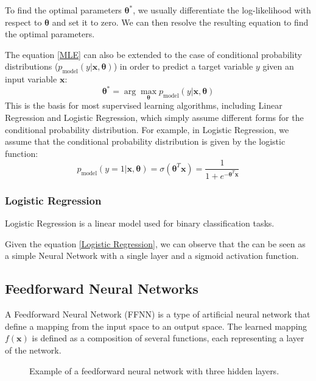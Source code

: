 To find the optimal parameters $\boldsymbol{\theta}^*$, we usually differentiate the log-likelihood with respect to $\boldsymbol{\theta}$ and set it
to zero. We can then resolve the resulting equation to find the optimal parameters.

The equation \ref{MLE} can also be extended to the case of conditional probability distributions ($p_{\text{model}}(y|\boldsymbol{x}, \boldsymbol{\theta})$) in order to predict a target variable $y$ given an input variable $\boldsymbol{x}$:
\begin{equation*}
    \boldsymbol{\theta}^* = \arg\max_{\boldsymbol{\theta}} p_{\text{model}}(y|\boldsymbol{x}, \boldsymbol{\theta})
\end{equation*}
This is the basis for most supervised learning algorithms, including Linear Regression and Logistic Regression, which simply assume different forms for the conditional probability distribution.
For example, in Logistic Regression, we assume that the conditional probability distribution is given by the logistic function:
\begin{equation}
    \label{Logistic Regression}
    p_{\text{model}}(y=1|\boldsymbol{x}, \boldsymbol{\theta}) = \sigma(\boldsymbol{\theta}^T \boldsymbol{x}) = \frac{1}{1 + e^{-\boldsymbol{\theta}^T \boldsymbol{x}}}
\end{equation}

\subsubsection{Logistic Regression}
Logistic Regression is a linear model used for binary classification tasks.

Given the equation \ref{Logistic Regression}, we can observe that the can be seen as a simple Neural Network with a single layer and a sigmoid activation function.

\subsection{Feedforward Neural Networks}
A Feedforward Neural Network (FFNN) is a type of artificial neural network that define a mapping from the input space
to an output space. The learned mapping $f(\boldsymbol{x})$ is defined as a composition of several functions, each representing a layer of the network.
\begin{figure}[H]
    \centering
    \scalebox{0.8}{
        
    }
    \caption{Example of a feedforward neural network with three hidden layers.}
    \label{fig:FFNN_example}
\end{figure}

